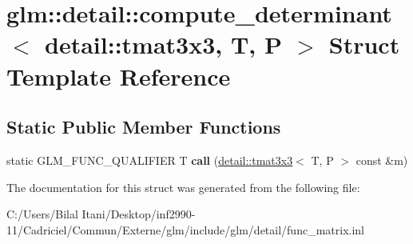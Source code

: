 \hypertarget{structglm_1_1detail_1_1compute__determinant_3_01detail_1_1tmat3x3_00_01_t_00_01_p_01_4}{}\section{glm\+:\+:detail\+:\+:compute\+\_\+determinant$<$ detail\+:\+:tmat3x3, T, P $>$ Struct Template Reference}
\label{structglm_1_1detail_1_1compute__determinant_3_01detail_1_1tmat3x3_00_01_t_00_01_p_01_4}
\subsection*{Static Public Member Functions}
\begin{DoxyCompactItemize}
\item 
static G\+L\+M\+\_\+\+F\+U\+N\+C\+\_\+\+Q\+U\+A\+L\+I\+F\+I\+ER T {\bfseries call} (\hyperlink{structglm_1_1detail_1_1tmat3x3}{detail\+::tmat3x3}$<$ T, P $>$ const \&m)\hypertarget{structglm_1_1detail_1_1compute__determinant_3_01detail_1_1tmat3x3_00_01_t_00_01_p_01_4_aacdeab0c051558a445f3f674dd6a5e8b}{}\label{structglm_1_1detail_1_1compute__determinant_3_01detail_1_1tmat3x3_00_01_t_00_01_p_01_4_aacdeab0c051558a445f3f674dd6a5e8b}

\end{DoxyCompactItemize}


The documentation for this struct was generated from the following file\+:\begin{DoxyCompactItemize}
\item 
C\+:/\+Users/\+Bilal Itani/\+Desktop/inf2990-\/11/\+Cadriciel/\+Commun/\+Externe/glm/include/glm/detail/func\+\_\+matrix.\+inl\end{DoxyCompactItemize}
